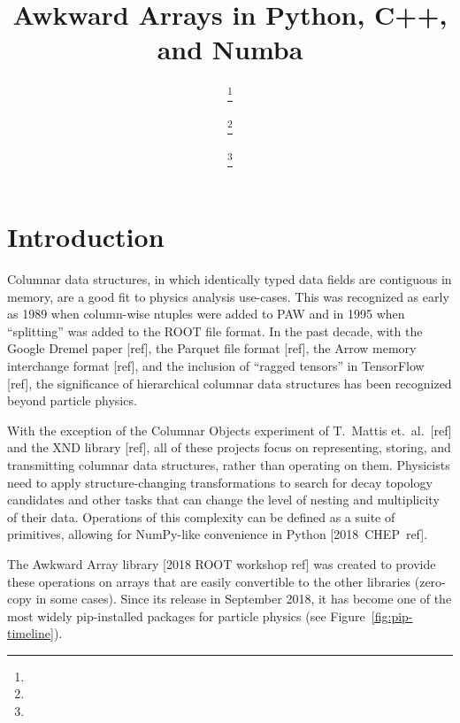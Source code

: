 \documentclass{webofc}
\begin{document}
\title{Awkward Arrays in Python, C++, and Numba}

\author{%
 \fnsep\thanks{} \and
{} \fnsep\thanks{} \and
{} \fnsep\thanks{}}



\maketitle

\section{Introduction}

Columnar data structures, in which identically typed data fields are contiguous in memory, are a good fit to physics analysis use-cases. This was recognized as early as 1989 when column-wise ntuples were added to PAW and in 1995 when ``splitting'' was added to the ROOT file format. In the past decade, with the Google Dremel paper [ref], the Parquet file format [ref], the Arrow memory interchange format [ref], and the inclusion of ``ragged tensors'' in TensorFlow [ref], the significance of hierarchical columnar data structures has been recognized beyond particle physics.

With the exception of the Columnar Objects experiment of T.\ Mattis et.\ al.\ [ref] and the XND library [ref], all of these projects focus on representing, storing, and transmitting columnar data structures, rather than operating on them. Physicists need to apply structure-changing transformations to search for decay topology candidates and other tasks that can change the level of nesting and multiplicity of their data. Operations of this complexity can be defined as a suite of primitives, allowing for NumPy-like convenience in Python \mbox{[2018 CHEP ref].\hspace{-1 cm}}

The Awkward Array library [2018 ROOT workshop ref] was created to provide these operations on arrays that are easily convertible to the other libraries (zero-copy in some cases). Since its release in September 2018, it has become one of the most widely pip-installed packages for particle physics (see Figure~\ref{fig:pip-timeline}).
\end{document}
